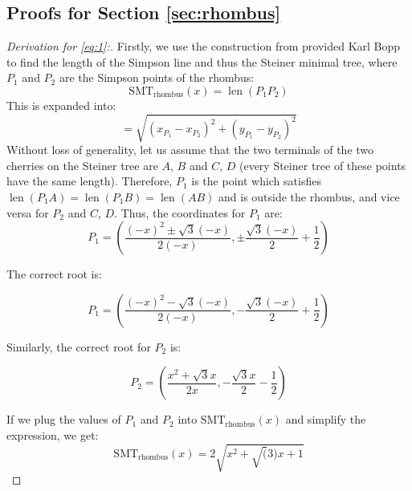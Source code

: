 \documentclass{mpaper}
\begin{document}
\subsection{Proofs for Section \ref{sec:rhombus}}

\begin{proof} [Derivation for \eqref{eq:1}:]

Firstly, we use the construction from provided Karl Bopp \cite{bopp} to find the length of the Simpson line and thus the Steiner minimal tree, where $P_1$ and $P_2$ are the Simpson points of the rhombus:
\[
  \operatorname{SMT_{rhombus}}(x) = \operatorname{len}(P_1P_2)
\]
This is expanded into:
\[
  = \sqrt{(x_{P_1}-x_{P_2})^2+(y_{P_1}-y_{P_2})^2}
\]
Without loss of generality, let us assume that the two terminals of the two cherries on the Steiner tree are $A$, $B$ and $C$, $D$ (every Steiner tree of these points have the same length). Therefore, $P_1$ is the point which satisfies $\operatorname{len}(P_1A)=\operatorname{len}(P_1B)=\operatorname{len}(AB)$ and is outside the rhombus, and vice versa for $P_2$ and $C$, $D$. Thus, the coordinates for $P_1$ are:
\[
  P_1 = \left(\frac{(-x)^{2} \pm \sqrt{3} (-x)}{2 (-x)}, \pm \frac{\sqrt{3} (-x)}{2} + \frac{1}{2}\right)
\]

The correct root is:

\[
  P_1 = \left(\frac{(-x)^{2} - \sqrt{3} (-x)}{2 (-x)}, - \frac{\sqrt{3} (-x)}{2} + \frac{1}{2}\right)
\]

Similarly, the correct root for $P_2$ is:

\[
  P_2 =\left(\frac{x^{2} + \sqrt{3} x}{2 x}, - \frac{\sqrt{3} x}{2} - \frac{1}{2}\right)
\]

If we plug the values of $P_1$ and $P_2$ into $\operatorname{SMT_{rhombus}}(x)$ and simplify the expression, we get:
\[
  \operatorname{SMT_{rhombus}}(x)=2\sqrt{x^2+\sqrt(3)x+1}
\]

  

  
  
\end{proof}
\end{document}
